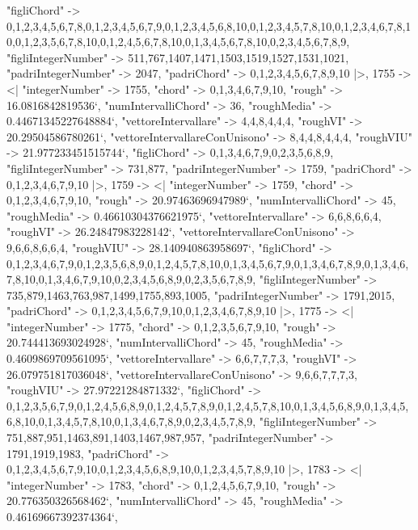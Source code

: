 \documentclass[
]{article}
\begin{document}
\begin{DatasetVerbatim}
    "figliChord" -> {{0,1,2,3,4,5,6,7,8},{0,1,2,3,4,5,6,7,9},{0,1,2,3,4,5,6,8,10},{0,1,2,3,4,5,7,8,10},{0,1,2,3,4,6,7,8,10},{0,1,2,3,5,6,7,8,10},{0,1,2,4,5,6,7,8,10},{0,1,3,4,5,6,7,8,10},{0,2,3,4,5,6,7,8,9}},
    "figliIntegerNumber" -> {511,767,1407,1471,1503,1519,1527,1531,1021},
    "padriIntegerNumber" -> {2047},
    "padriChord" -> {{0,1,2,3,4,5,6,7,8,9,10}}
  |>,
  1755 -> <|
    "integerNumber" -> 1755,
    "chord" -> {0,1,3,4,6,7,9,10},
    "rough" -> 16.0816842819536`,
    "numIntervalliChord" -> 36,
    "roughMedia" -> 0.44671345227648884`,
    "vettoreIntervallare" -> {4,4,8,4,4,4},
    "roughVI" -> 20.29504586780261`,
    "vettoreIntervallareConUnisono" -> {8,4,4,8,4,4,4},
    "roughVIU" -> 21.977233451515744`,
    "figliChord" -> {{0,1,3,4,6,7,9},{0,2,3,5,6,8,9}},
    "figliIntegerNumber" -> {731,877},
    "padriIntegerNumber" -> {1759},
    "padriChord" -> {{0,1,2,3,4,6,7,9,10}}
  |>,
  1759 -> <|
    "integerNumber" -> 1759,
    "chord" -> {0,1,2,3,4,6,7,9,10},
    "rough" -> 20.97463696947989`,
    "numIntervalliChord" -> 45,
    "roughMedia" -> 0.46610304376621975`,
    "vettoreIntervallare" -> {6,6,8,6,6,4},
    "roughVI" -> 26.24847983228142`,
    "vettoreIntervallareConUnisono" -> {9,6,6,8,6,6,4},
    "roughVIU" -> 28.140940863958697`,
    "figliChord" -> {{0,1,2,3,4,6,7,9},{0,1,2,3,5,6,8,9},{0,1,2,4,5,7,8,10},{0,1,3,4,5,6,7,9},{0,1,3,4,6,7,8,9},{0,1,3,4,6,7,8,10},{0,1,3,4,6,7,9,10},{0,2,3,4,5,6,8,9},{0,2,3,5,6,7,8,9}},
    "figliIntegerNumber" -> {735,879,1463,763,987,1499,1755,893,1005},
    "padriIntegerNumber" -> {1791,2015},
    "padriChord" -> {{0,1,2,3,4,5,6,7,9,10},{0,1,2,3,4,6,7,8,9,10}}
  |>,
  1775 -> <|
    "integerNumber" -> 1775,
    "chord" -> {0,1,2,3,5,6,7,9,10},
    "rough" -> 20.744413693024928`,
    "numIntervalliChord" -> 45,
    "roughMedia" -> 0.4609869709561095`,
    "vettoreIntervallare" -> {6,6,7,7,7,3},
    "roughVI" -> 26.079751817036048`,
    "vettoreIntervallareConUnisono" -> {9,6,6,7,7,7,3},
    "roughVIU" -> 27.97221284871332`,
    "figliChord" -> {{0,1,2,3,5,6,7,9},{0,1,2,4,5,6,8,9},{0,1,2,4,5,7,8,9},{0,1,2,4,5,7,8,10},{0,1,3,4,5,6,8,9},{0,1,3,4,5,6,8,10},{0,1,3,4,5,7,8,10},{0,1,3,4,6,7,8,9},{0,2,3,4,5,7,8,9}},
    "figliIntegerNumber" -> {751,887,951,1463,891,1403,1467,987,957},
    "padriIntegerNumber" -> {1791,1919,1983},
    "padriChord" -> {{0,1,2,3,4,5,6,7,9,10},{0,1,2,3,4,5,6,8,9,10},{0,1,2,3,4,5,7,8,9,10}}
  |>,
  1783 -> <|
    "integerNumber" -> 1783,
    "chord" -> {0,1,2,4,5,6,7,9,10},
    "rough" -> 20.776350326568462`,
    "numIntervalliChord" -> 45,
    "roughMedia" -> 0.46169667392374364`,

\end{DatasetVerbatim}
\end{document}
